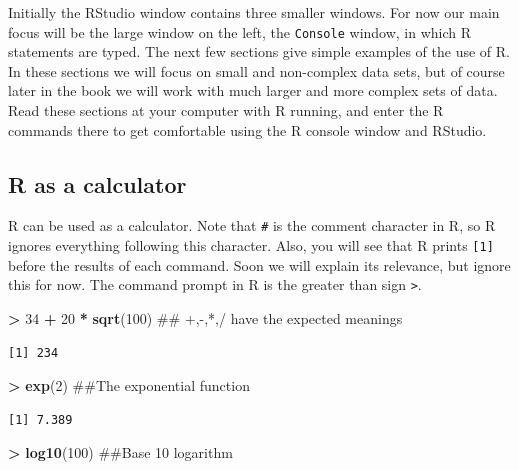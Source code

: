 \documentclass[]{krantz}
\makeatletter
\newenvironment{Shaded}{\begin{snugshade}}{\end{snugshade}}
\newcommand{\KeywordTok}[1]{\textcolor[rgb]{0.27,0.27,0.27}{\textbf{#1}}}
\newcommand{\DecValTok}[1]{\textcolor[rgb]{0.06,0.06,0.06}{#1}}
\newcommand{\StringTok}[1]{\textcolor[rgb]{0.5,0.5,0.5}{#1}}
\newcommand{\OperatorTok}[1]{\textcolor[rgb]{0.43,0.43,0.43}{\textbf{#1}}}
\newcommand{\NormalTok}[1]{#1}
\newenvironment{kframe}{%
\medskip{}
\setlength{\fboxsep}{.8em}
 \def\at@end@of@kframe{}%
 \ifinner\ifhmode%
  \def\at@end@of@kframe{\end{minipage}}%
  \begin{minipage}{\columnwidth}%
 \fi\fi%
 \def\FrameCommand##1{\hskip\@totalleftmargin \hskip-\fboxsep
 \colorbox{shadecolor}{##1}\hskip-\fboxsep
     \hskip-\linewidth \hskip-\@totalleftmargin \hskip\columnwidth}%
 \MakeFramed {\advance\hsize-\width
   \@totalleftmargin\z@ \linewidth\hsize
   \@setminipage}}%
 {\par\unskip\endMakeFramed%
 \at@end@of@kframe}
\renewenvironment{Shaded}{\begin{kframe}}{\end{kframe}}
\theoremstyle{definition}
\theoremstyle{definition}
\theoremstyle{definition}
\theoremstyle{remark}
\makeatother
\begin{document}
Initially the RStudio window contains three smaller windows. For now our
main focus will be the large window on the left, the \texttt{Console}
window, in which R statements are typed. The next few sections give
simple examples of the use of R. In these sections we will focus on
small and non-complex data sets, but of course later in the book we will
work with much larger and more complex sets of data. Read these sections
at your computer with R running, and enter the R commands there to get
comfortable using the R console window and RStudio.

\subsection{R as a calculator}\label{r-as-a-calculator}

R can be used as a calculator. Note that \texttt{\#} is the comment
character in R, so R ignores everything following this character. Also,
you will see that R prints \texttt{{[}1{]}} before the results of each
command. Soon we will explain its relevance, but ignore this for now.
The command prompt in R is the greater than sign
\texttt{\textgreater{}}.

\begin{Shaded}
\begin{Highlighting}[]
\OperatorTok{>}\StringTok{ }\DecValTok{34} \OperatorTok{+}\StringTok{ }\DecValTok{20} \OperatorTok{*}\StringTok{ }\KeywordTok{sqrt}\NormalTok{(}\DecValTok{100}\NormalTok{)  ## +,-,*,/ have the expected meanings}
\end{Highlighting}
\end{Shaded}

\begin{verbatim}
[1] 234
\end{verbatim}

\begin{Shaded}
\begin{Highlighting}[]
\OperatorTok{>}\StringTok{ }\KeywordTok{exp}\NormalTok{(}\DecValTok{2}\NormalTok{)  ##The exponential function}
\end{Highlighting}
\end{Shaded}

\begin{verbatim}
[1] 7.389
\end{verbatim}

\begin{Shaded}
\begin{Highlighting}[]
\OperatorTok{>}\StringTok{ }\KeywordTok{log10}\NormalTok{(}\DecValTok{100}\NormalTok{)  ##Base 10 logarithm}
\end{Highlighting}
\end{Shaded}
\end{document}

